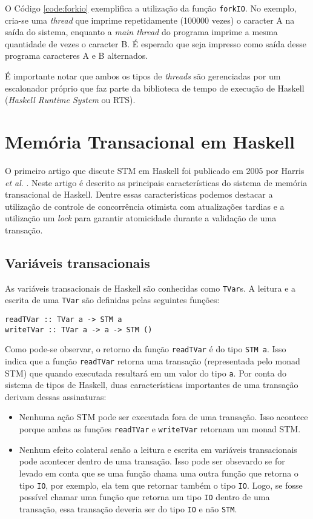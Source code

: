 O Código \ref{code:forkio} exemplifica a utilização da função \verb|forkIO|. No exemplo, cria-se uma \emph{thread} que imprime repetidamente (100000 vezes) o caracter A na saída do sistema, enquanto a \emph{main thread} do programa imprime a mesma quantidade de vezes o caracter B. É esperado que seja impresso como saída desse programa caracteres A e B alternados.

É importante notar que ambos os tipos de \emph{threads} são gerenciadas por um escalonador próprio que faz parte da biblioteca de tempo de execução de Haskell (\emph{Haskell Runtime System} ou RTS). 

\section{Memória Transacional em Haskell}

O primeiro artigo que discute STM em Haskell foi publicado em 2005 por Harris \emph{et al}. \cite{harris2005composable}. Neste artigo é descrito as principais características do sistema de memória transacional de Haskell. Dentre essas características podemos destacar a utilização de controle de concorrência otimista com atualizações tardias e a utilização um \emph{lock} para garantir atomicidade durante a validação de uma transação.

\subsection{Variáveis transacionais}

As variáveis transacionais de Haskell são conhecidas como \verb|TVar|s. A leitura e a escrita de uma \verb|TVar| são definidas pelas seguintes funções:
\begin{verbatim}
readTVar :: TVar a -> STM a
writeTVar :: TVar a -> a -> STM ()
\end{verbatim}

Como pode-se observar, o retorno da função \verb|readTVar| é do tipo \verb|STM a|. Isso indica que a função \verb|readTVar| retorna uma transação (representada pelo monad STM) que quando executada resultará em um valor do tipo \verb|a|. Por conta do sistema de tipos de Haskell, duas características importantes de uma transação derivam dessas assinaturas:
\begin{itemize}
  \item Nenhuma ação STM pode ser executada fora de uma transação. Isso acontece porque ambas as funções \verb|readTVar| e \verb|writeTVar| retornam um monad STM.
  \item Nenhum efeito colateral senão a leitura e escrita em variáveis transacionais pode acontecer dentro de uma transação. Isso pode ser obsevardo se for levado em conta que se uma função chama uma outra função que retorna o tipo \verb|IO|, por exemplo, ela tem que retornar também o tipo \verb|IO|. Logo, se fosse possível chamar uma função que retorna um tipo \verb|IO| dentro de uma transação, essa transação deveria ser do tipo \verb|IO| e não \verb|STM|.
\end{itemize}

